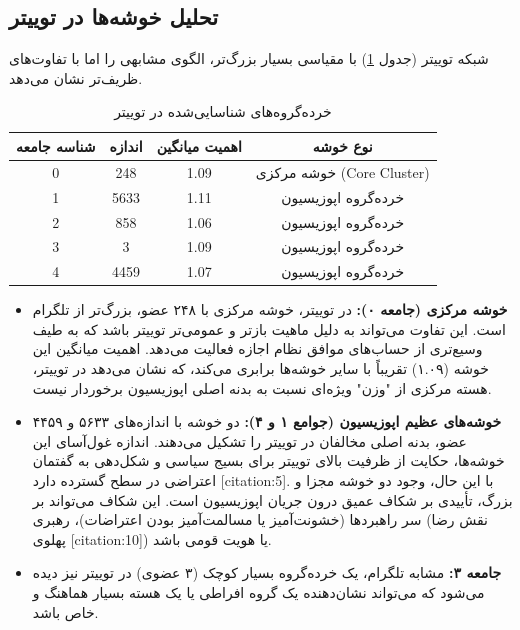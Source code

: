 \documentclass{article}
\begin{document}
	\subsection{تحلیل خوشه‌ها در توییتر}
	شبکه توییتر (جدول \ref{tab:communities_twitter_2}) با مقیاسی بسیار بزرگ‌تر، الگوی مشابهی را اما با تفاوت‌های ظریف‌تر نشان می‌دهد.
	
	\begin{table}[h!]
		\centering
		\caption{خرده‌گروه‌های شناسایی‌شده در توییتر}
		\label{tab:communities_twitter_2}
		\begin{tabular}{@{}cccc@{}}
			\toprule
			\textbf{شناسه جامعه} & \textbf{اندازه} & \textbf{اهمیت میانگین} & \textbf{نوع خوشه} \\ \midrule
			0                    & 248              & 1.09                   & خوشه مرکزی (Core Cluster) \\
			1                    & 5633             & 1.11                   & خرده‌گروه اپوزیسیون \\
			2                    & 858              & 1.06                   & خرده‌گروه اپوزیسیون \\
			3                    & 3                & 1.09                   & خرده‌گروه اپوزیسیون \\
			4                    & 4459             & 1.07                   & خرده‌گروه اپوزیسیون \\ \bottomrule
		\end{tabular}
	\end{table}
	
	\begin{itemize}
		\item \textbf{خوشه مرکزی (جامعه ۰):} در توییتر، خوشه مرکزی با ۲۴۸ عضو، بزرگ‌تر از تلگرام است. این تفاوت می‌تواند به دلیل ماهیت بازتر و عمومی‌تر توییتر باشد که به طیف وسیع‌تری از حساب‌های موافق نظام اجازه فعالیت می‌دهد. اهمیت میانگین این خوشه (۱.۰۹) تقریباً با سایر خوشه‌ها برابری می‌کند، که نشان می‌دهد در توییتر، هسته مرکزی از "وزن" ویژه‌ای نسبت به بدنه اصلی اپوزیسیون برخوردار نیست.
		\item \textbf{خوشه‌های عظیم اپوزیسیون (جوامع ۱ و ۴):} دو خوشه با اندازه‌های ۵۶۳۳ و ۴۴۵۹ عضو، بدنه اصلی مخالفان در توییتر را تشکیل می‌دهند. اندازه غول‌آسای این خوشه‌ها، حکایت از ظرفیت بالای توییتر برای بسیج سیاسی و شکل‌دهی به گفتمان اعتراضی در سطح گسترده دارد [citation:5]. با این حال، وجود دو خوشه مجزا و بزرگ، تأییدی بر شکاف عمیق درون جریان اپوزیسیون است. این شکاف می‌تواند بر سر راهبردها (خشونت‌آمیز یا مسالمت‌آمیز بودن اعتراضات)، رهبری (نقش رضا پهلوی [citation:10]) یا هویت قومی باشد.
		\item \textbf{جامعه ۳:} مشابه تلگرام، یک خرده‌گروه بسیار کوچک (۳ عضوی) در توییتر نیز دیده می‌شود که می‌تواند نشان‌دهنده یک گروه افراطی یا یک هسته بسیار هماهنگ و خاص باشد.
	\end{itemize}
	
\end{document}

